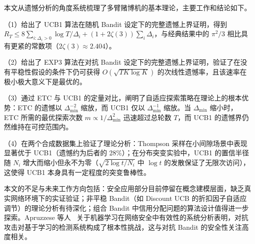 \documentclass[UTF8,a4paper,11pt,zihao=5]{ctexart}
\newcommand{\regret}[1]{R_{#1}}
\begin{document}
本文从遗憾分析的角度系统梳理了多臂赌博机的基本理论，主要工作和结论如下。

（1）给出了 UCB1 算法在随机 Bandit 设定下的完整遗憾上界证明，得到 $\regret{T} \leq 8\sum_{i:\Delta_i>0} \log T / \Delta_i + (1+2\zeta(3))\sum_i\Delta_i$，与经典结果中的 $\pi^2/3$ 相比具有更紧的常数项（$2\zeta(3) \approx 2.404$）。

（2）给出了 EXP3 算法在对抗 Bandit 设定下的完整遗憾上界证明，验证了在没有平稳性假设的条件下仍可获得 $O(\sqrt{TK\log K})$ 的次线性遗憾率，且该速率在极小极大意义下是最优的。

（3）通过 ETC 与 UCB1 的定量对比，阐明了自适应探索策略在理论上的根本优势：ETC 的遗憾以 $\Delta_{\min}^{-2}$ 缩放，而 UCB1 仅以 $\Delta_{\min}^{-1}$ 缩放。当 $\Delta_{\min}$ 缩小时，ETC 所需的最优探索次数 $m \propto 1/\Delta_{\min}^2$ 迅速超过总轮数 $T$，而 UCB1 的遗憾界仍然维持在可控范围内。

（4）在两个合成数据集上验证了理论分析：Thompson 采样在小间隙场景中表现显著优于 UCB1（遗憾约为后者的 28\%）；在分布突变实验中，UCB1 的置信半径随 $N_i$ 增大而缩小但永不为零（$\sqrt{2\log t/N_i}$ 中 $\log t$ 的发散保证了无限次访问），这使得 UCB1 本身具有一定程度的突变鲁棒性。

本文的不足与未来工作方向包括：安全应用部分目前停留在概念建模层面，缺乏真实网络环境下的实证验证；非平稳 Bandit（如 Discount UCB 的折扣因子自适应调节）的理论分析有待深化；组合 Bandit 中信用分配问题的算法设计值得进一步探索。Apruzzese 等人~\cite{apruzzese2018} 关于机器学习在网络安全中有效性的系统分析表明，对抗攻击对基于学习的检测系统构成了根本性挑战，这与对抗 Bandit 的安全性关注高度相关。

\newpage
\end{document}
